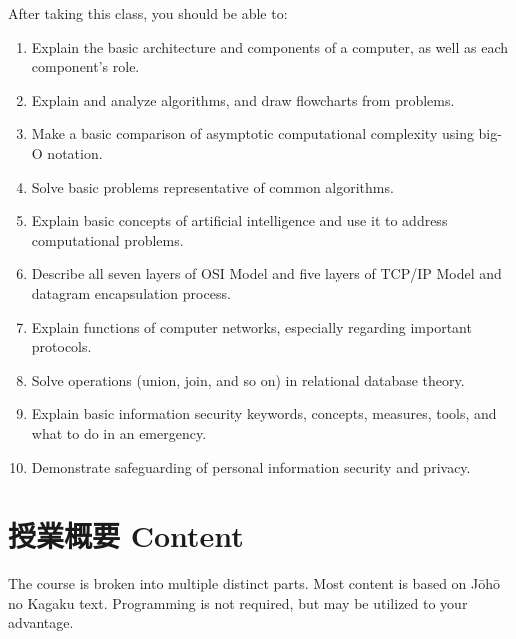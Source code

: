 \documentclass{article}
\begin{document}
After taking this class, you should be able to:
\begin{enumerate}
    \item Explain the basic architecture and components of a computer, as well as each component's role.
   	\item Explain and analyze algorithms, and draw flowcharts from problems.
   	\item Make a basic comparison of asymptotic computational complexity using big-O notation.
   	\item Solve basic problems representative of common algorithms.
   	\item Explain basic concepts of artificial intelligence and use it to address computational problems.
   	\item Describe all seven layers of OSI Model and five layers of TCP/IP Model and datagram encapsulation process.
   	\item Explain functions of computer networks, especially regarding important protocols.
   	\item Solve operations (union, join, and so on) in relational database theory.
   	\item Explain basic information security keywords, concepts, measures, tools, and what to do in an emergency.
   	\item Demonstrate safeguarding of personal information security and privacy.
\end{enumerate}

\section{授業概要 Content}
The course is broken into multiple distinct parts. Most content is based on J\={o}h\={o} no Kagaku text. Programming is not required, but may be utilized to your advantage.
\end{document}
